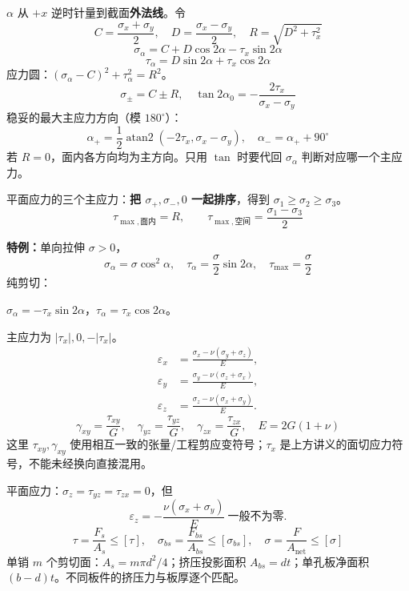 \documentclass[a4paper,10pt,fontset=none]{ctexart}
\begin{document}
\clearpage
{}
\begin{leftcol}
$\alpha$ 从 $+x$ 逆时针量到截面\textbf{外法线}。令
\[
C=\frac{\sigma_x+\sigma_y}{2},\quad D=\frac{\sigma_x-\sigma_y}{2},\quad
R=\sqrt{D^2+\tau_x^2}
\]
\[
\boxed{\sigma_\alpha=C+D\cos2\alpha-\tau_x\sin2\alpha}
\]
\[
\boxed{\tau_\alpha=D\sin2\alpha+\tau_x\cos2\alpha}
\]
应力圆：$(\sigma_\alpha-C)^2+\tau_\alpha^2=R^2$。
\[
\sigma_{\pm}=C\pm R,\quad
\tan2\alpha_0=-\frac{2\tau_x}{\sigma_x-\sigma_y}
\]
稳妥的最大主应力方向（模 $180^\circ$）：
\[
\alpha_+=\frac12\operatorname{atan2}(-2\tau_x,\sigma_x-\sigma_y),\quad
\alpha_-=\alpha_++90^\circ
\]
若 $R=0$，面内各方向均为主方向。只用 $\tan$ 时要代回 $\sigma_\alpha$ 判断对应哪一个主应力。
\begin{answerbox}
平面应力的三个主应力：\textbf{把 $\sigma_+,\sigma_-,0$ 一起排序}，得到 $\sigma_1\ge\sigma_2\ge\sigma_3$。
\[
\tau_{\max,\text{面内}}=R,\qquad
\tau_{\max,\text{空间}}=\frac{\sigma_1-\sigma_3}{2}
\]
\end{answerbox}
\textbf{特例：}单向拉伸 $\sigma>0$，
\[
\sigma_\alpha=\sigma\cos^2\alpha,\quad
\tau_\alpha=\frac\sigma2\sin2\alpha,\quad \tau_{\max}=\frac\sigma2
\]
纯剪切：\par
$\sigma_\alpha=-\tau_x\sin2\alpha$，$\tau_\alpha=\tau_x\cos2\alpha$。\par
主应力为 $|\tau_x|,0,-|\tau_x|$。
\[
\begin{aligned}
\varepsilon_x&=\frac{\sigma_x-\nu(\sigma_y+\sigma_z)}{E},\\
\varepsilon_y&=\frac{\sigma_y-\nu(\sigma_z+\sigma_x)}{E},\\
\varepsilon_z&=\frac{\sigma_z-\nu(\sigma_x+\sigma_y)}{E}.
\end{aligned}
\]
\[
\gamma_{xy}=\frac{\tau_{xy}}G,\quad
\gamma_{yz}=\frac{\tau_{yz}}G,\quad
\gamma_{zx}=\frac{\tau_{zx}}G,\quad E=2G(1+\nu)
\]
这里 $\tau_{xy},\gamma_{xy}$ 使用相互一致的张量/工程剪应变符号；$\tau_x$ 是上方讲义的面切应力符号，不能未经换向直接混用。

平面应力：$\sigma_z=\tau_{yz}=\tau_{zx}=0$，但
\[
\varepsilon_z=-\frac{\nu(\sigma_x+\sigma_y)}E\ \text{一般不为零}.
\]
\[
\tau=\frac{F_s}{A_s}\le[\tau],\quad
\sigma_{bs}=\frac{F_{bs}}{A_{bs}}\le[\sigma_{bs}],\quad
\sigma=\frac{F}{A_{\text{net}}}\le[\sigma]
\]
单销 $m$ 个剪切面：$A_s=m\pi d^2/4$；挤压投影面积 $A_{bs}=dt$；单孔板净面积 $(b-d)t$。不同板件的挤压力与板厚逐个匹配。
\end{leftcol}
\end{document}
